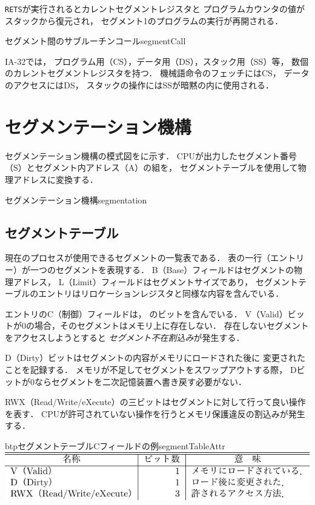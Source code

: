 \texttt{RETS}が実行されるとカレントセグメントレジスタと
プログラムカウンタの値がスタックから復元され，
セグメント1のプログラムの実行が再開される．

{セグメント間のサブルーチンコール}{segmentCall}

IA-32では，
プログラム用（CS），データ用（DS），スタック用（SS）等，
数個のカレントセグメントレジスタを持つ．
機械語命令のフェッチにはCS，
データのアクセスにはDS，
スタックの操作にはSSが暗黙の内に使用される\cite{ia32SegmentReg}．


\section{セグメンテーション機構}
セグメンテーション機構の模式図をに示す．
CPUが出力したセグメント番号（S）とセグメント内アドレス（A）の組を，
セグメントテーブルを使用して物理アドレスに変換する．

{セグメンテーション機構}{segmentation}

\subsection{セグメントテーブル}
現在のプロセスが使用できるセグメントの一覧表である．
表の一行（エントリー）が一つのセグメントを表現する．
B（Base）フィールドはセグメントの物理アドレス，
L（Limit）フィールドはセグメントサイズであり，
セグメントテーブルのエントリはリロケーションレジスタと同様な内容を含んでいる．

エントリのC（制御）フィールドは，
のビットを含んでいる．
V（Valid）ビットが0の場合，そのセグメントはメモリ上に存在しない．
存在しないセグメントをアクセスしようとすると
\emph{セグメント不在割込み}が発生する．

D（Dirty）ビットはセグメントの内容がメモリにロードされた後に
変更されたことを記録する．
メモリが不足してセグメントをスワップアウトする際，
Dビットが0ならセグメントを二次記憶装置へ書き戻す必要がない．

RWX（Read/Write/eXecute）の三ビットはセグメントに対して行って良い操作を表す．
CPUが許可されていない操作を行うとメモリ保護違反の割込みが発生する．

\begin{mytable}{btp}{セグメントテーブルCフィールドの例}{segmentTableAttr}
  \includegraphics[scale=1.0]{Tbl/segmentTableAttr.pdf}
\end{mytable}

